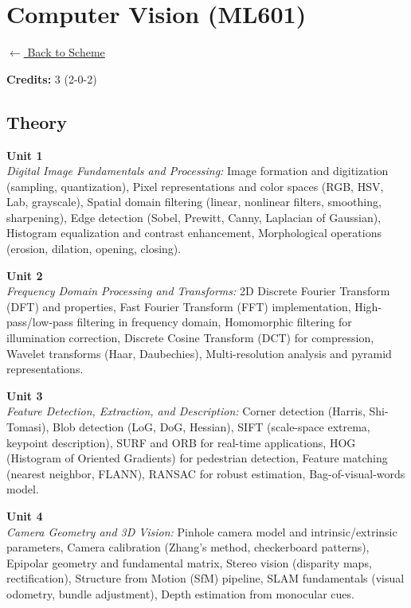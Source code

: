 \section*{Computer Vision (ML601)}
\label{major:ML_6}

\noindent \small{\hyperref[main:scheme]{$\leftarrow$ Back to Scheme}} \vspace{0.5cm}

\noindent \textbf{Credits:} 3 (2-0-2)

\subsection*{Theory}
\noindent\textbf{Unit 1} \\
\textit{Digital Image Fundamentals and Processing:} Image formation and digitization (sampling, quantization), Pixel representations and color spaces (RGB, HSV, Lab, grayscale), Spatial domain filtering (linear, nonlinear filters, smoothing, sharpening), Edge detection (Sobel, Prewitt, Canny, Laplacian of Gaussian), Histogram equalization and contrast enhancement, Morphological operations (erosion, dilation, opening, closing).

\vspace{0.3cm}

\noindent\textbf{Unit 2} \\
\textit{Frequency Domain Processing and Transforms:} 2D Discrete Fourier Transform (DFT) and properties, Fast Fourier Transform (FFT) implementation, High-pass/low-pass filtering in frequency domain, Homomorphic filtering for illumination correction, Discrete Cosine Transform (DCT) for compression, Wavelet transforms (Haar, Daubechies), Multi-resolution analysis and pyramid representations.

\vspace{0.3cm}

\noindent\textbf{Unit 3} \\
\textit{Feature Detection, Extraction, and Description:} Corner detection (Harris, Shi-Tomasi), Blob detection (LoG, DoG, Hessian), SIFT (scale-space extrema, keypoint description), SURF and ORB for real-time applications, HOG (Histogram of Oriented Gradients) for pedestrian detection, Feature matching (nearest neighbor, FLANN), RANSAC for robust estimation, Bag-of-visual-words model.

\vspace{0.3cm}

\noindent\textbf{Unit 4} \\
\textit{Camera Geometry and 3D Vision:} Pinhole camera model and intrinsic/extrinsic parameters, Camera calibration (Zhang's method, checkerboard patterns), Epipolar geometry and fundamental matrix, Stereo vision (disparity maps, rectification), Structure from Motion (SfM) pipeline, SLAM fundamentals (visual odometry, bundle adjustment), Depth estimation from monocular cues.


